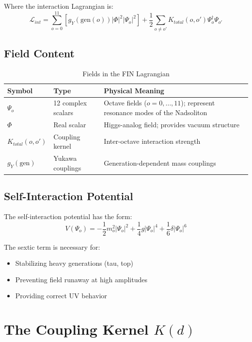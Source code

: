 \documentclass[11pt, a4paper]{article}
\theoremstyle{remark}
\newcommand{\Lagr}{\mathcal{L}}
\begin{document}
Where the interaction Lagrangian is:
\begin{equation}
\Lagr_{int} = \sum_{o=0}^{11} \left[ g_Y(\text{gen}(o)) |\Phi|^2 |\Psi_o|^2 \right]
    + \frac{1}{2} \sum_{o \neq o'} K_{total}(o, o') \Psi_o^\dagger \Psi_{o'}
\end{equation}

\subsection{Field Content}

\begin{table}[H]
\centering
\caption{Fields in the FIN Lagrangian}
\begin{tabular}{|l|l|p{8cm}|}
\hline
\textbf{Symbol} & \textbf{Type} & \textbf{Physical Meaning} \\
\hline
$\Psi_o$ & 12 complex scalars & Octave fields ($o = 0, \ldots, 11$); represent resonance modes of the Nadsoliton \\
\hline
$\Phi$ & Real scalar & Higgs-analog field; provides vacuum structure \\
\hline
$K_{total}(o, o')$ & Coupling kernel & Inter-octave interaction strength \\
\hline
$g_Y(\text{gen})$ & Yukawa couplings & Generation-dependent mass couplings \\
\hline
\end{tabular}
\end{table}

\subsection{Self-Interaction Potential}

The self-interaction potential has the form:
\begin{equation}
V(\Psi_o) = -\frac{1}{2} m_o^2 |\Psi_o|^2 + \frac{1}{4} g |\Psi_o|^4 + \frac{1}{6} \delta |\Psi_o|^6
\end{equation}

The sextic term is necessary for:
\begin{itemize}
    \item Stabilizing heavy generations (tau, top)
    \item Preventing field runaway at high amplitudes
    \item Providing correct UV behavior
\end{itemize}

\section{The Coupling Kernel $K(d)$}
\end{document}
